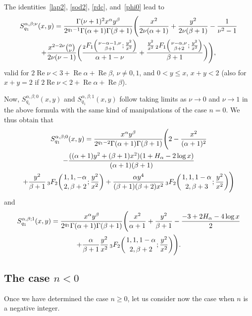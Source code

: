 \documentclass[10pt,leqno,a4paper]{article}
\theoremstyle{plain}
\renewcommand{\Re}{\operatorname{Re}}
\numberwithin{equation}{section}
\newcommand{\FF}[3]{{}_{2}F_{1}%
  \mathopen{}\left(\genfrac{}{}{0pt}{}{#1}{#2};#3\right)\mathclose{}}
\newcommand{\tresFFdos}[3]{{}_{3}F_{2}%
  \mathopen{}\left(\genfrac{}{}{0pt}{}{#1}{#2};#3\right)\mathclose{}}
\begin{document}
The identities~\eqref{lap2}, \eqref{sod2}, \eqref{rdc}, and~\eqref{phi0} lead to
\begin{multline*}
   S_{q_1}^{\alpha,\beta;\nu}(x,y)
   = \frac{\Gamma(\nu+1)^2 x^\alpha y^\beta}{2^{q_1-1}\Gamma(\alpha+1)\Gamma(\beta+1)}
   \Bigg(
   \frac{x^2}{2\nu(\alpha+1)} + \frac{y^2}{2\nu(\beta+1)} - \frac{1}{\nu^2-1}
   \\
   + \frac{x^{2-2\nu}\binom{\alpha}{\nu}}{2\nu(\nu-1)}
   \bigg(
   \frac{\FF{\nu-\alpha-1,\nu}{\beta+1}{\frac{y^2}{x^2}}}{\alpha+1-\nu}
   + \frac{\frac{y^2}{x^2} \,\FF{\nu-\alpha,\nu}{\beta+2}{\frac{y^2}{x^2}}}{\beta+1}
   \bigg)
   \Bigg),
\end{multline*}
valid for $2\Re \nu < 3+\Re \alpha+\Re \beta$, $\nu\neq 0,1$, and $0 < y\leq x$, $x+y < 2$ (also for $x+y=2$ if $2\Re \nu < 2+\Re \alpha+\Re \beta$).

Now, $S_{q_1}^{\alpha,\beta;0}(x,y)$ and $S_{q_1}^{\alpha,\beta;1}(x,y)$
follow taking limits as $\nu \to 0$ and $\nu \to 1$ in the above formula with the same kind of manipulations of the case $n=0$. We thus obtain that
\begin{multline*}
   S_{q_1}^{\alpha,\beta;0}(x,y)
   = \frac{x^\alpha y^\beta}{2^{q_1-2}\Gamma(\alpha+1)\Gamma(\beta+1)}
   \Bigg(
  2 - \frac{x^2}{(\alpha+1)^2}
  \\
  - \frac{((\alpha+1)y^2+(\beta+1)x^2)(1+H_\alpha-2\log x)}{(\alpha+1)(\beta+1)}
  \\
  + \frac{y^2}{\beta+1} \,\tresFFdos{1,1,-\alpha}{2,\beta+2}{\frac{y^2}{x^2}}
  + \frac{\alpha y^4}{(\beta+1)(\beta+2)x^2}
  \,\tresFFdos{1,1,1-\alpha}{2,\beta+3}{\frac{y^2}{x^2}}
   \Bigg)
\end{multline*}
and
\begin{multline*}
   S_{q_1}^{\alpha,\beta;1}(x,y)
   = \frac{x^\alpha y^\beta}{2^{q_1}\Gamma(\alpha+1)\Gamma(\beta+1)}
   \Bigg(
  \frac{x^2}{\alpha+1} + \frac{y^2}{\beta+1}
  - \frac{-3+2H_\alpha-4\log x}{2}
  \\
  + \frac{\alpha}{\beta+1}\frac{y^2}{x^2}
  \,\tresFFdos{1,1,1-\alpha}{2,\beta+2}{\frac{y^2}{x^2}}
   \Bigg).
\end{multline*}

\subsection{The case $n<0$}
\label{cason<0}

Once we have determined the case $n \geq 0$, let us consider now the case when $n$ is a negative integer.
\end{document}
